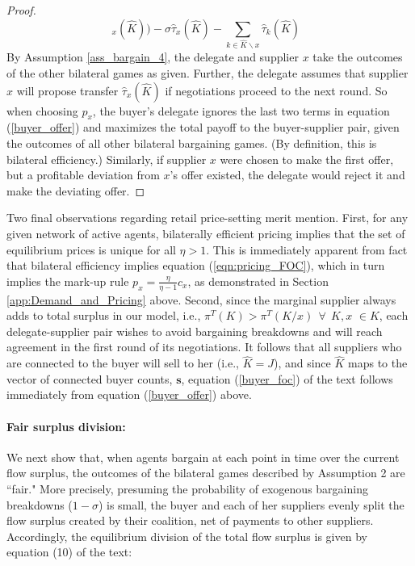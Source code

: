 \documentclass[12pt]{article} \usepackage{amsmath,amssymb,amsthm,geometry,graphicx,setspace,algorithm,algpseudocode,float}
\newcommand{\subsubsubsection}[1]{\paragraph{#1}}
\begin{document}
\begin{proof}
\begin{equation}
_{x}(\hat{K}))-\sigma \hat{\tau}_{x}(\hat{K})-\sum_{k\in \hat{K}\backslash x}%
\hat{\tau}_{k}(\hat{K})\text{ }
\label{buyer_offer}
\end{equation}%
By Assumption \ref{ass_bargain_4}, the delegate and supplier $x$ take the outcomes of the other bilateral games as given. Further, the delegate assumes that supplier $x$ will propose transfer $\hat{\tau}_x(\hat{K})$ if negotiations proceed to the next round. So when choosing $p_{x}$, the buyer's delegate ignores the last two terms in equation (\ref{buyer_offer}) and maximizes the total payoff to the buyer-supplier pair, given the outcomes of all other bilateral bargaining games. (By definition, this is bilateral efficiency.) Similarly, if supplier $x$ were chosen to make the first offer, but a profitable deviation from $x$'s offer existed, the delegate would reject it and make the deviating offer.
\end{proof}
\par
Two final observations regarding retail price-setting merit mention. First, for any given network of active agents, bilaterally efficient pricing implies that the set of equilibrium prices is unique for all $ \eta>1$. This is immediately apparent from fact that bilateral efficiency implies equation (\ref{eqn:pricing_FOC}), which in turn implies the mark-up rule $p_{x}= \frac{\eta}{\eta-1}c_x$, as demonstrated in Section \ref{app:Demand_and_Pricing} above. Second, since the marginal supplier always adds to total surplus in our model, i.e., $\pi^T(K) > \pi^T(K/x) \ \ \forall \ \ K,x$ $ \in K$, each delegate-supplier pair wishes to avoid bargaining breakdowns and will reach agreement in the first round of its negotiations. It follows that all suppliers who are connected to the buyer will sell to her (i.e., $\hat{K}=J$), and since $\hat{K}$ maps to the vector of connected buyer counts, $\mathbf{s}$, equation (\ref{buyer_foc}) of the text follows immediately from equation (\ref{buyer_offer}) above.
\par
\subsubsubsection{\textbf{Fair surplus division:}}
\label{sec:fair_division}
 We next show that, when agents bargain at each point in time over the current flow surplus, the outcomes of the bilateral games described by Assumption 2 are ``fair." More precisely, presuming the probability of exogenous bargaining breakdowns ($1-\sigma$) is small, the buyer and each of her suppliers evenly split the flow surplus created by their coalition, net of payments to other suppliers. Accordingly, the equilibrium division of the total flow surplus is given by equation (10) of the text:\bigskip 
\end{document}
